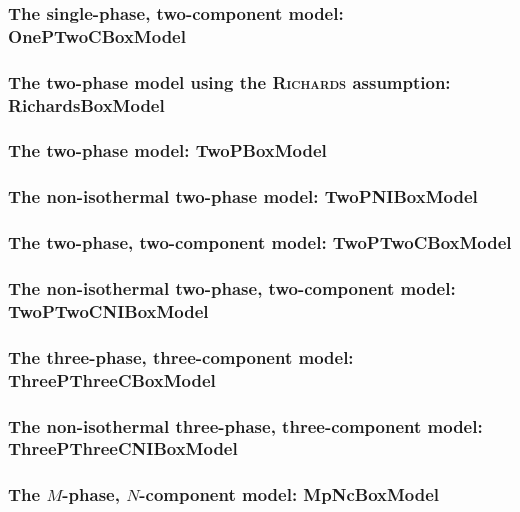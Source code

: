 \subsubsection{The single-phase, two-component model:  OnePTwoCBoxModel} 


\subsubsection{The two-phase model using the \textsc{Richards} assumption: RichardsBoxModel} 


\subsubsection{The two-phase model: TwoPBoxModel}


\subsubsection{The non-isothermal two-phase model: TwoPNIBoxModel} 


\subsubsection{The two-phase, two-component model: TwoPTwoCBoxModel} 


\subsubsection{The non-isothermal two-phase, two-component model: TwoPTwoCNIBoxModel} 


\subsubsection{The three-phase, three-component model: ThreePThreeCBoxModel}


\subsubsection{The non-isothermal three-phase, three-component model: ThreePThreeCNIBoxModel} 


\subsubsection{The $M$-phase, $N$-component model: MpNcBoxModel} 


